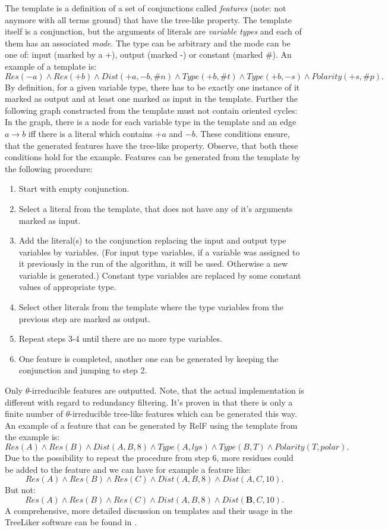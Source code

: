 \documentclass[11pt,twoside,a4paper]{book}
\begin{document}
The template is a definition of a set of conjunctions called \emph{features}
(note: not anymore with all terms ground)
that have the tree-like property. 
The template itself is a conjunction,
but the arguments of literals are \emph{variable types} and each of them has an associated \emph{mode}.
The type can be arbitrary and the mode can be one of:
input (marked by a +), output (marked -) or constant (marked \#).
An example of a template is:
\[ Res(-a)\land Res(+b)\land Dist(+a, -b, \#n)\land Type(+b, \#t)\land Type(+b, -s)\land Polarity(+s, \#p). \]
By definition, for a given variable type, there has to be exactly one instance of it 
marked as output and at least one marked as input in the template.
Further the following graph constructed from the template must not contain oriented cycles: 
In the graph, there is a node for each variable type in the template and an edge $a \rightarrow b$
iff there is a literal which contains $+a$ and $-b$.
These conditions ensure,
that the generated features have the tree-like property.
Observe, that both these conditions hold for the example.
Features can be generated from the template by the following procedure:
\begin{enumerate}
 \item Start with empty conjunction.
 \item Select a literal from the template, that does not have any of it's arguments marked as input.
 \item Add the literal(s) to the conjunction replacing the input and output type variables by variables.
       (For input type variables, if a variable was assigned to it previously in the run of the algorithm,
       it will be used. Otherwise a new variable is generated.)
       Constant type variables are replaced by some constant values of appropriate type.
 \item Select other literals from the template where the type variables from the previous step are marked as output.
 \item Repeat steps 3-4 until there are no more type variables.
 \item One feature is completed, another one can be generated by keeping the conjunction and jumping to step 2.
\end{enumerate}
Only $\theta$-irreducible features are outputted. 
Note, that the actual implementation is different with regard to redundancy filtering. 
It's proven in \cite{relf} that there is only a finite number of $\theta$-irreducible tree-like features
which can be generated this way.
An example of a feature that can be generated by RelF using the template from the example is:
\[ Res(A) \land Res(B)\land Dist(A,B,8)\land Type(A, lys)\land Type(B, T)\land Polarity(T, polar). \]
Due to the possibility to repeat the procedure from step 6,
more residues could be added to the feature and we can have for example a feature like:
\[ Res(A)\land Res(B)\land Res(C)\land Dist(A,B,8)\land Dist(A,C,10). \]
But not:
\[ Res(A)\land Res(B)\land Res(C)\land Dist(A,B,8)\land Dist(\mathbf{B},C,10). \]
A comprehensive, more detailed discussion on templates and their usage in the TreeLiker software
can be found in \cite{szabova}.
\end{document}
